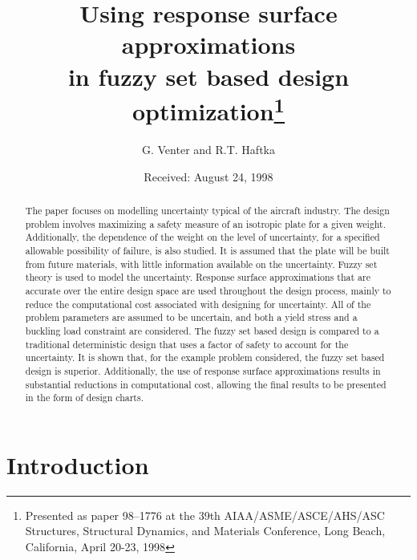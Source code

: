 \documentclass[stropt]{svjour}
\begin{document}
%
\title{Using response surface approximations\\ in fuzzy set based
design optimization\thanks{Presented as paper 98--1776 at the
39th AIAA\-/ASME/\-ASCE/\-AHS/\-ASC Structures, Structural Dynamics, and Materials
Conference, Long Beach, California, April 20-23, 1998}}
\author{G. Venter and R.T. Haftka}
%
%
\date{Received: August 24, 1998}
%
\maketitle
%
\begin{abstract}
The paper focuses on modelling uncertainty typical of the aircraft industry.
The design problem involves maximizing a safety measure of an isotropic
plate for a given weight.
Additionally, the dependence of the weight on the level of uncertainty,
for a specified allowable possibility of failure, is also studied.
It is assumed that the plate will be built from future materials, with
little information available on the uncertainty.
Fuzzy set theory is used to model the uncertainty.
Response surface approximations that are accurate over the entire design
space are used throughout the design process, mainly to reduce the
computational cost associated with designing for uncertainty.
All of the problem parameters are assumed to be uncertain, and both a
yield stress and a buckling load constraint are considered.
The fuzzy set based design is compared to a traditional deterministic
design that uses a factor of safety to account for the uncertainty.
It is shown that, for the example problem considered, the fuzzy
set based design is superior.
Additionally, the use of response surface approximations results in
substantial reductions in computational cost, allowing the final results to
be presented in the form of design charts.
\end{abstract}
\section{Introduction}
\label{sec01}
\end{document}
